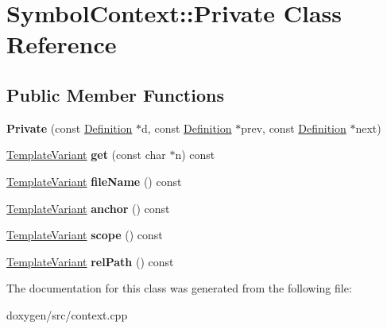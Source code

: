 \hypertarget{class_symbol_context_1_1_private}{}\section{Symbol\+Context\+::Private Class Reference}
\label{class_symbol_context_1_1_private}
\subsection*{Public Member Functions}
\begin{DoxyCompactItemize}
\item 
\mbox{\label{class_symbol_context_1_1_private_ac64b59a720350b45d86debac8ef05c50}} 
{\bfseries Private} (const \mbox{\hyperlink{class_definition}{Definition}} $\ast$d, const \mbox{\hyperlink{class_definition}{Definition}} $\ast$prev, const \mbox{\hyperlink{class_definition}{Definition}} $\ast$next)
\item 
\mbox{\label{class_symbol_context_1_1_private_a8ff1056f3271f8dcc93f20f775b36656}} 
\mbox{\hyperlink{class_template_variant}{Template\+Variant}} {\bfseries get} (const char $\ast$n) const
\item 
\mbox{\label{class_symbol_context_1_1_private_a4f4d2e0778a8a3349c28febd33123814}} 
\mbox{\hyperlink{class_template_variant}{Template\+Variant}} {\bfseries file\+Name} () const
\item 
\mbox{\label{class_symbol_context_1_1_private_a51dcff5546cd13ea3a2c10b8980b6a25}} 
\mbox{\hyperlink{class_template_variant}{Template\+Variant}} {\bfseries anchor} () const
\item 
\mbox{\label{class_symbol_context_1_1_private_ab7b232e7b13afe378c5f03226b0e2a91}} 
\mbox{\hyperlink{class_template_variant}{Template\+Variant}} {\bfseries scope} () const
\item 
\mbox{\label{class_symbol_context_1_1_private_abfb56f9a9c4503028ac6f083815c4e93}} 
\mbox{\hyperlink{class_template_variant}{Template\+Variant}} {\bfseries rel\+Path} () const
\end{DoxyCompactItemize}


The documentation for this class was generated from the following file\+:\begin{DoxyCompactItemize}
\item 
doxygen/src/context.\+cpp\end{DoxyCompactItemize}
